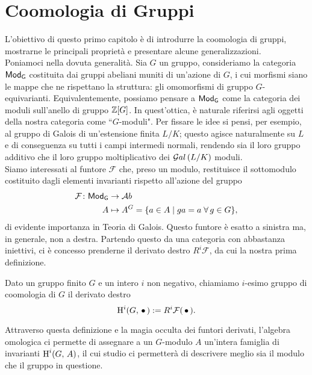 \chapter{Coomologia di Gruppi}


L'obiettivo di questo primo capitolo è di introdurre la coomologia di gruppi, mostrarne le principali proprietà e presentare alcune generalizzazioni.\\

Poniamoci nella dovuta generalità. Sia $ G $ un gruppo, consideriamo la categoria $ \mathsf{Mod}_\mathsf{G} $ costituita dai gruppi abeliani muniti di un'azione di $ G $, i cui morfismi siano le mappe che ne rispettano la struttura: gli omomorfismi di gruppo $ G $-equivarianti. Equivalentemente, possiamo pensare a $ \mathsf{Mod}_\mathsf{G} $ come la categoria dei moduli sull'anello di gruppo $ \mathbb{Z}[G] $. In quest'ottica, è naturale riferirsi agli oggetti della nostra categoria come \textquotedblleft$ G $-moduli".
Per fissare le idee si pensi, per esempio, al gruppo di Galois di un'estensione finita $ L/K $; questo agisce naturalmente su $ L $ e di conseguenza su tutti i campi intermedi normali, rendendo sia il loro gruppo additivo che il loro gruppo moltiplicativo dei $ \mathcal{G}al\left( L/K \right) $ moduli. \\

Siamo interessati al funtore $ \mathcal{F} $ che, preso un modulo, restituisce il sottomodulo costituito dagli elementi invarianti rispetto all'azione del gruppo
\begin{align*} 
\mathcal{F} \colon \mathsf{Mod}_\mathsf{G} &\to \mathcal{A}b \\
A &\mapsto A^G = \{ a \in A \mid ga = a \; \forall \, g \in G \},
\end{align*}
di evidente importanza in Teoria di Galois. Questo funtore è esatto a sinistra ma, in generale, non a destra. Partendo questo da una categoria con abbastanza iniettivi, ci è concesso prenderne il derivato destro $ R^i\mathcal{F} $, da cui la nostra prima definizione.

\begin{definition}
	Dato un gruppo finito $ G $ e un intero $ i $ non negativo, chiamiamo $ i $-esimo gruppo di coomologia di $ G $ il derivato destro
	\[ \operatorname{H}^i(G, \, \bullet\,) : = R^i\mathcal{F}(\,\bullet\,). \]
\end{definition}

Attraverso questa definizione e la magia occulta dei funtori derivati, l'algebra omologica ci permette di assegnare a un $ G $-modulo $ A $ un'intera famiglia di invarianti $ \operatorname{H}^i(G, \, A) $, il cui studio ci permetterà di descrivere meglio sia il modulo che il gruppo in questione. 

